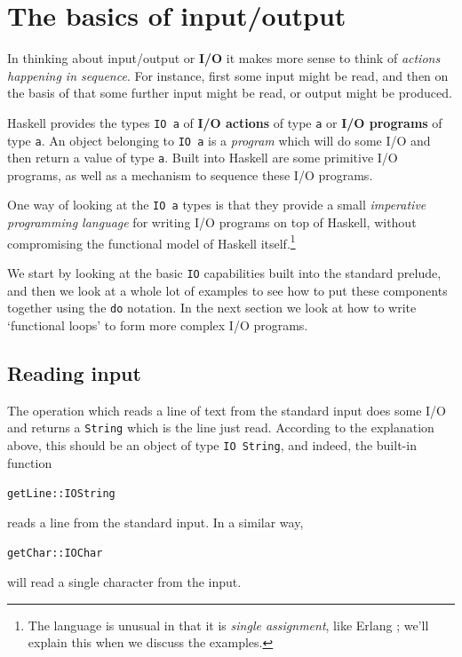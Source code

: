 \section{The basics of input/output}
\label{basicsIO}



In
thinking about input/output 
or \textbf{I/O} it makes more sense
to think of \emph{actions happening in sequence}. For instance, first
some input might be read,
and then on the basis of that some further input might be read, or output might be 
produced. 

Haskell provides the types \texttt{IO a}
of \textbf{I/O actions} of type \texttt{a} or \textbf{I/O programs} of type
\texttt{a}. An object belonging to \texttt{IO a}
is a \emph{program} which will do some I/O and then return a value of type
\texttt{a}. Built into Haskell are some primitive I/O programs, as well
as a mechanism to sequence these I/O programs. 

One way of looking
at the \texttt{IO a} types is that they provide a small \emph{imperative
programming 
language} for writing I/O programs on top of Haskell, without compromising the functional
model of Haskell itself.\footnote{The language is unusual in that it is \emph{single assignment}, like Erlang \cite{progErlang,erlangProg}; we'll explain this when we discuss the examples.}

We start by looking at the basic \texttt{IO} capabilities built into the standard prelude, and then we look at a whole lot of examples to see how to put these components together using the
\texttt{do} notation. In the next section we look at how to write `functional loops' to form more complex I/O programs.




\subsection*{Reading input}

The operation which reads a line of text from the standard input does some I/O and
returns a \texttt{String} which is the line just read. According to the
explanation above, this should be an object of type \texttt{IO String}, and
indeed, the built-in function 
\begin{alltt}
getLine :: IO String
\end{alltt}
reads a line from the standard input. In a similar way, 
\begin{alltt}
getChar :: IO Char
\end{alltt}
will read a single character from the input.

